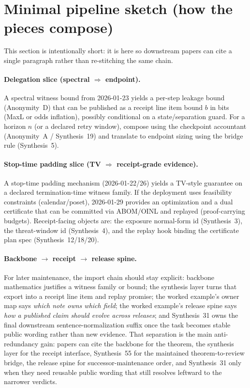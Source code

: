 \documentclass[11pt]{article}
\begin{document}
\section{Minimal pipeline sketch (how the pieces compose)}
This section is intentionally short: it is here so downstream papers can cite a single paragraph rather than re-stitching the same chain.

\paragraph{Delegation slice (spectral $\Rightarrow$ endpoint).}
A spectral witness bound from 2026-01-23 yields a per-step leakage bound (Anonymity~D) that can be published as a receipt line item bound $b$ in bits (MaxL or odds inflation), possibly conditional on a state/separation guard.
For a horizon $n$ (or a declared retry window), compose using the checkpoint accountant (Anonymity~A / Synthesis~19) and translate to endpoint sizing using the bridge rule (Synthesis~5).\cite{series:spectral2budget,series:oddsinflation,series:receiptacct,series:endpointbridge}

\paragraph{Stop-time padding slice (TV $\Rightarrow$ receipt-grade evidence).}
A stop-time padding mechanism (2026-01-22/26) yields a TV-style guarantee on a declared termination-time witness family.
If the deployment uses feasibility constraints (calendar/poset), 2026-01-29 provides an optimization and a dual certificate that can be committed via ABOM/OINL and replayed (proof-carrying budgets).
Receipt-facing objects are: the exposure normal-form id (Synthesis~3), the threat-window id (Synthesis~4), and the replay hook binding the certificate plan spec (Synthesis~12/18/20).\cite{series:traceifaces,series:threatwindows,series:receiptitems,series:planstateequiv,series:auditorreplay,wiki:scheduling,wiki:stopadd,wiki:knapsack}

\paragraph{Backbone $\to$ receipt $\to$ release spine.}
For later maintenance, the import chain should stay explicit: backbone mathematics justifies a witness family or bound; the synthesis layer turns that export into a receipt line item and replay promise; the worked example's owner map says \emph{which note owns which field}; the worked example's release spine says \emph{how a published claim should evolve across releases}; and Synthesis~31 owns the final downstream sentence-normalization suffix once the task becomes stable public wording rather than new evidence. That separation is the main anti-redundancy gain: papers can cite the backbone for the theorem, the synthesis layer for the receipt interface, Synthesis~55 for the maintained theorem-to-review bridge, the release spine for successor-maintenance order, and Synthesis~31 only when they need reusable public wording that still resolves leftward to the narrower verdicts.\cite{series:receiptitems,series:planstateequiv,series:workedexample,series:downstreamnormalforms,series:seriesspines}
\end{document}
